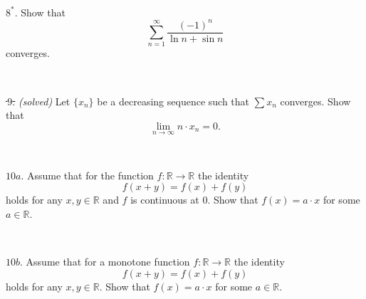 \documentclass{article}
\def\noi{\noindent}%
\def\RR{\mathbb{R}}%
\begin{document}
\ 

\noi $8^*\!$. Show that 
$$\sum_{n=1}^\infty  \frac{(-1)^n}{\ln n+\sin n}$$ 
converges.

\ 

\noi \sout{\,$9$.} \textit{(solved)}
Let $\{ x_n \}$ be a decreasing sequence such that $\sum x_n$ converges.
Show that 
\[\lim_{n\to\infty} n{\cdot}x_n = 0.\]

\ 

\noi $10a$.
Assume that for the function $f \colon \RR \to \RR$ the identity
\[f(x+y) = f(x) + f(y)\]
holds for any $x,y\in\RR$ and $f$ is continuous at $0$.
Show that $f(x) = a\cdot x$ for some $a \in \RR$.


\ 

\noi $10b$.
Assume that for a monotone function $f \colon \RR \to \RR$ the identity
\[f(x+y) = f(x) + f(y)\]
holds for any $x,y\in\RR$.
Show that $f(x) = a\cdot x$ for some $a \in \RR$.
\end{document}
